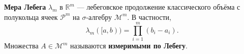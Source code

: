 \label{definition:18}

\begin{definition}
\textbf{Мера Лебега} $\lambda_m$ в $\mathbb R^m$ --- лебеговское продолжение классического объёма с полукольца ячеек $\mathcal P^m$ на $\sigma$-алгебру $\mathcal M^m$.
В частности,
\[
  \lambda_m([a,b))=\prod_{i=1}^{m}(b_i-a_i).
\]
Множества $A\in\mathcal M^m$ называются \textbf{измеримыми по Лебегу}.
\end{definition}
